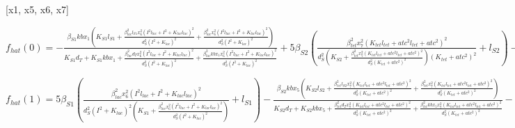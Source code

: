 [x1, x5, x6, x7]


$f_{hat}(0)=- \frac{\beta_{S1} kb x_{1} \left(K_{S1} l_{S1} + \frac{\beta_{lac}^{2} l_{S1} x_{6}^{2} \left(I^{2} l_{lac} + I^{2} + K_{lac} l_{lac}\right)^{2}}{d_{S}^{2} \left(I^{2} + K_{lac}\right)^{2}} + \frac{\beta_{lac}^{2} x_{6}^{2} \left(I^{2} l_{lac} + I^{2} + K_{lac} l_{lac}\right)^{2}}{d_{S}^{2} \left(I^{2} + K_{lac}\right)^{2}}\right)}{K_{S1} d_{T} + K_{S1} kb x_{1} + \frac{\beta_{lac}^{2} d_{T} x_{6}^{2} \left(I^{2} l_{lac} + I^{2} + K_{lac} l_{lac}\right)^{2}}{d_{S}^{2} \left(I^{2} + K_{lac}\right)^{2}} + \frac{\beta_{lac}^{2} kb x_{1} x_{6}^{2} \left(I^{2} l_{lac} + I^{2} + K_{lac} l_{lac}\right)^{2}}{d_{S}^{2} \left(I^{2} + K_{lac}\right)^{2}}} + 5 \beta_{S2} \left(\frac{\beta_{tet}^{2} x_{7}^{2} \left(K_{tet} l_{tet} + atc^{2} l_{tet} + atc^{2}\right)^{2}}{d_{S}^{2} \left(K_{S2} + \frac{\beta_{tet}^{2} x_{7}^{2} \left(K_{tet} l_{tet} + atc^{2} l_{tet} + atc^{2}\right)^{2}}{d_{S}^{2} \left(K_{tet} + atc^{2}\right)^{2}}\right) \left(K_{tet} + atc^{2}\right)^{2}} + l_{S2}\right) - d_{T} x_{1}$


$f_{hat}(1)=5 \beta_{S1} \left(\frac{\beta_{lac}^{2} x_{6}^{2} \left(I^{2} l_{lac} + I^{2} + K_{lac} l_{lac}\right)^{2}}{d_{S}^{2} \left(I^{2} + K_{lac}\right)^{2} \left(K_{S1} + \frac{\beta_{lac}^{2} x_{6}^{2} \left(I^{2} l_{lac} + I^{2} + K_{lac} l_{lac}\right)^{2}}{d_{S}^{2} \left(I^{2} + K_{lac}\right)^{2}}\right)} + l_{S1}\right) - \frac{\beta_{S2} kb x_{5} \left(K_{S2} l_{S2} + \frac{\beta_{tet}^{2} l_{S2} x_{7}^{2} \left(K_{tet} l_{tet} + atc^{2} l_{tet} + atc^{2}\right)^{2}}{d_{S}^{2} \left(K_{tet} + atc^{2}\right)^{2}} + \frac{\beta_{tet}^{2} x_{7}^{2} \left(K_{tet} l_{tet} + atc^{2} l_{tet} + atc^{2}\right)^{2}}{d_{S}^{2} \left(K_{tet} + atc^{2}\right)^{2}}\right)}{K_{S2} d_{T} + K_{S2} kb x_{5} + \frac{\beta_{tet}^{2} d_{T} x_{7}^{2} \left(K_{tet} l_{tet} + atc^{2} l_{tet} + atc^{2}\right)^{2}}{d_{S}^{2} \left(K_{tet} + atc^{2}\right)^{2}} + \frac{\beta_{tet}^{2} kb x_{5} x_{7}^{2} \left(K_{tet} l_{tet} + atc^{2} l_{tet} + atc^{2}\right)^{2}}{d_{S}^{2} \left(K_{tet} + atc^{2}\right)^{2}}} - d_{T} x_{5}$


